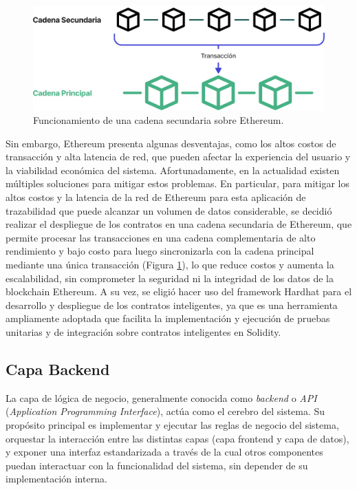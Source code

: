 \begin{figure}[!htb]
    \centering
    \includegraphics[width=0.9\linewidth]{Figures/blockchain-layer-2.png}
    \caption{Funcionamiento de una cadena secundaria sobre Ethereum.}
    \label{fig:ethereum-layer-2}
\end{figure}

Sin embargo, Ethereum presenta algunas desventajas, como los altos costos de transacción y alta latencia de red, que pueden afectar la experiencia del usuario y la viabilidad económica del sistema. Afortunadamente, en la actualidad existen múltiples soluciones para mitigar estos problemas. En particular, para mitigar los altos costos y la latencia de la red de Ethereum para esta aplicación de trazabilidad que puede alcanzar un volumen de datos considerable, se decidió realizar el despliegue de los contratos en una cadena secundaria de Ethereum, que permite procesar las transacciones en una cadena complementaria de alto rendimiento y bajo costo para luego sincronizarla con la cadena principal mediante una única transacción (Figura \ref{fig:ethereum-layer-2}), lo que reduce costos y aumenta la escalabilidad, sin comprometer la seguridad ni la integridad de los datos de la blockchain Ethereum. A su vez, se eligió hacer uso del framework Hardhat para el desarrollo y despliegue de los contratos inteligentes, ya que es una herramienta ampliamente adoptada que facilita la implementación y ejecución de pruebas unitarias y de integración sobre contratos inteligentes en Solidity.

\subsection{Capa Backend}

La capa de lógica de negocio, generalmente conocida como \textit{backend} o \textit{API} (\textit{Application Programming Interface}), actúa como el cerebro del sistema. Su propósito principal es implementar y ejecutar las reglas de negocio del sistema, orquestar la interacción entre las distintas capas (capa frontend y capa de datos), y exponer una interfaz estandarizada a través de la cual otros componentes puedan interactuar con la funcionalidad del sistema, sin depender de su implementación interna.

